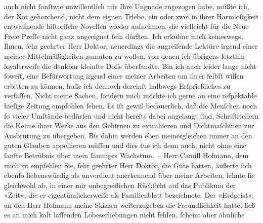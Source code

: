 \begin{ledgroupsized}[t]{13cm}
                    auch nicht {\pb}ſonſtwie unwillentlich mir Ihre Ungnade
                    zugezogen habe, müßte ich, der Not gehorchend, nicht dem eignen Triebe, ein oder
                    zwei in ihrer Harmloſigkeit entwaffnende hiſtoriſche Novellen wieder aufnehmen,
                    die vielleicht für die Neue Freie Preſſe nicht
                    ganz ungeeignet ſein dürften. Ich erkühne mich keineswegs, Ihnen, ſehr geehrter
                    Herr Doktor, neuerdings die angreifende Lektüre irgend einer meiner
                    Mittelmäßigkeiten zumuten zu wollen, von denen ich übrigens letzthin
                    loyalerweiſe die denkbar kleinſte Doſis überſandte. Bin ich auch leider lange
                    nicht ſoweit, eine Befürwortung irgend einer meiner Arbeiten um ihrer ſelbſt
                    willen erbitten zu können, hoffe ich dennoch dereinſt halbwegs Erſprießliches zu
                    verfaſſen. Nicht meine Sachen, {\pb}ſondern mich möchte ich
                    gerne an eine reſpektable hieſige Zeitung empfohlen ſehen. Es iſt gewiß
                    bedauerlich, daß die Menſchen noch ſo vieler Umſtände bedürfen und nicht bereits
                    dabei angelangt ſind, Schriftſtellern die Keime ihrer Werke aus den Gehirnen zu
                    extrahieren und Dichtmaſchinen zur Ausbrütung zu übergeben. Bis dahin werden
                    eben meinesgleichen immer an den guten Glauben appellieren müſſen und dies tue
                    ich denn auch, nicht ohne eine ſanfte Betrübnis über mein ſäumiges Wachstum. –
                    Herr Camill Hofmann, dem mich zu empfehlen
                    Sie, ſehr geehrter Herr Doktor, die Güte hatten, äußerte ſich ebenſo
                    liebenswürdig als unverdient anerkennend über meine Arbeiten, lehnte ſie
                    gleichwohl ab, in einer {\pb}mir unbegreiflichen Rückſicht
                    auf das Publikum der »Zeit«, die er
                    eigentümlicherweiſe als Familienblatt bezeichnete. Der »Erdgeist«, an den Herr Hofmann meine Skizzen weiterzugeben die Freundlichkeit hatte, ließ es
                    an mich kalt laſſenden Lobeserhebungen nicht fehlen, ſcheint aber ähnliche

\end{ledgroupsized}
